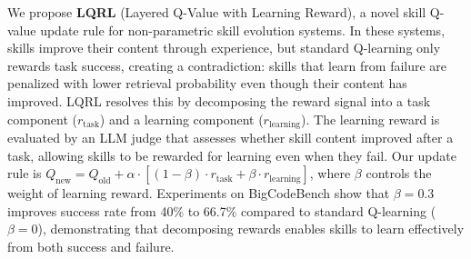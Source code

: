 
We propose \textbf{LQRL} (Layered Q-Value with Learning Reward), a novel skill Q-value update rule for non-parametric skill evolution systems. In these systems, skills improve their content through experience, but standard Q-learning only rewards task success, creating a contradiction: skills that learn from failure are penalized with lower retrieval probability even though their content has improved. LQRL resolves this by decomposing the reward signal into a task component ($r_{\text{task}}$) and a learning component ($r_{\text{learning}}$). The learning reward is evaluated by an LLM judge that assesses whether skill content improved after a task, allowing skills to be rewarded for learning even when they fail. Our update rule is $Q_{\text{new}} = Q_{\text{old}} + \alpha \cdot [(1-\beta) \cdot r_{\text{task}} + \beta \cdot r_{\text{learning}}]$, where $\beta$ controls the weight of learning reward. Experiments on BigCodeBench show that $\beta=0.3$ improves success rate from 40\% to 66.7\% compared to standard Q-learning ($\beta=0$), demonstrating that decomposing rewards enables skills to learn effectively from both success and failure.
